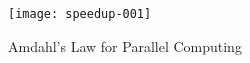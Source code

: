 \begin{figure}
  \label{fig:amdahl}
  \centering
\texttt{[image: speedup-001]}
\caption{Amdahl's Law for Parallel Computing}
\end{figure}
